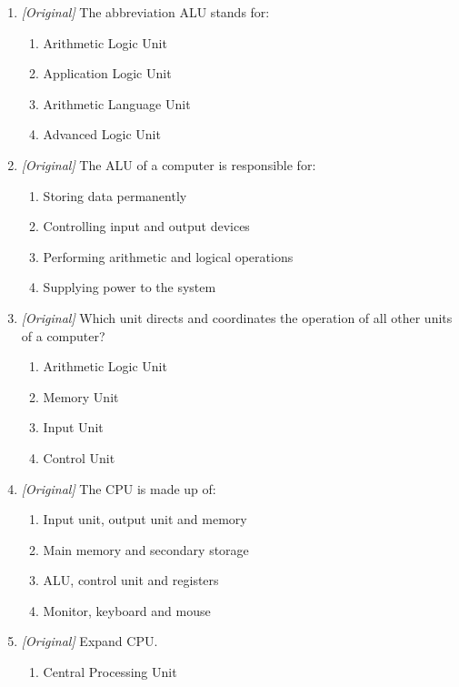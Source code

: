 \begin{enumerate}[label=\textbf{Q\arabic*.}, leftmargin=*]
\item \textit{[Original]} The abbreviation ALU stands for:
  \begin{enumerate}[label=\Alph*.]
    \item Arithmetic Logic Unit
    \item Application Logic Unit
    \item Arithmetic Language Unit
    \item Advanced Logic Unit
  \end{enumerate}
\item \textit{[Original]} The ALU of a computer is responsible for:
  \begin{enumerate}[label=\Alph*.]
    \item Storing data permanently
    \item Controlling input and output devices
    \item Performing arithmetic and logical operations
    \item Supplying power to the system
  \end{enumerate}
\item \textit{[Original]} Which unit directs and coordinates the operation of
  all other units of a computer?
  \begin{enumerate}[label=\Alph*.]
    \item Arithmetic Logic Unit
    \item Memory Unit
    \item Input Unit
    \item Control Unit
  \end{enumerate}
\item \textit{[Original]} The CPU is made up of:
  \begin{enumerate}[label=\Alph*.]
    \item Input unit, output unit and memory
    \item Main memory and secondary storage
    \item ALU, control unit and registers
    \item Monitor, keyboard and mouse
  \end{enumerate}
\item \textit{[Original]} Expand CPU.
  \begin{enumerate}[label=\Alph*.]
    \item Central Processing Unit

\end{enumerate}
\end{enumerate}
